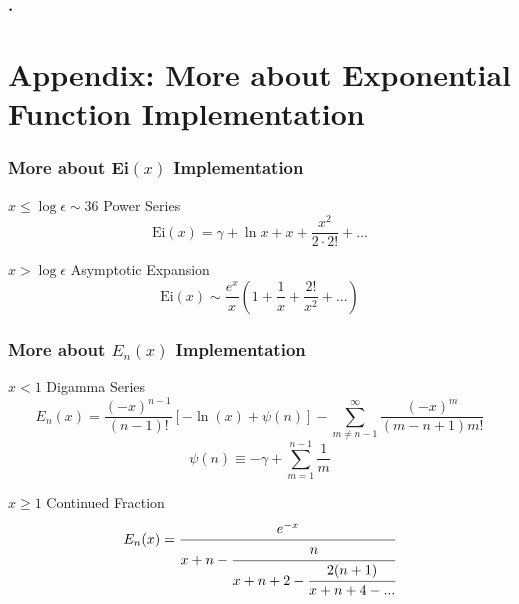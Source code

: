 \documentclass{beamer}
\begin{document}
\begin{frame}\frametitle{.}
{}
\end{frame}


\appendix
\section{Appendix: More about Exponential Function Implementation}
\begin{frame}\frametitle{More about Ei$(x)$ Implementation}
\label{Ei_exp}
\begin{exampleblock}{$x\leq\log{\epsilon}\sim36$ Power Series}
\[\mbox{Ei}(x)=\gamma + \ln{x} + x + \frac{x^2}{2\cdot2!}+...\]
\end{exampleblock}
\begin{exampleblock}{$x>\log{\epsilon}$ Asymptotic Expansion}
\[\mbox{Ei}(x)\sim\frac{e^x}{x}\left(1+\frac{1}{x}+\frac{2!}{x^2}+...\right)\]
\end{exampleblock}
\hyperlink{origEiEn}{}
\end{frame}

\begin{frame}\frametitle{More about $E_n(x)$ Implementation}
\label{En_exp}
\begin{exampleblock}{$x<1$ Digamma Series}
\[E_n(x)=\frac{(-x)^{n-1}}{(n-1)!}[-\ln(x)+\psi(n)] -
  \sum_{m\neq n-1}^\infty\frac{(-x)^m}{(m-n+1)m!}\]
\[\psi(n)\equiv-\gamma+\sum_{m=1}^{n-1}\frac{1}{m}\]
\end{exampleblock}
\begin{exampleblock}{$x\geq1$ Continued Fraction}
\[
E_n(x)=\cfrac{e^{-x}}{x+n
                     - \cfrac{n}{x+n+2
                     - \cfrac{2(n+1)}{x+n+4-...}}}
\]
\end{exampleblock}
\hyperlink{origEiEn}{}
\end{frame}
\end{document}
